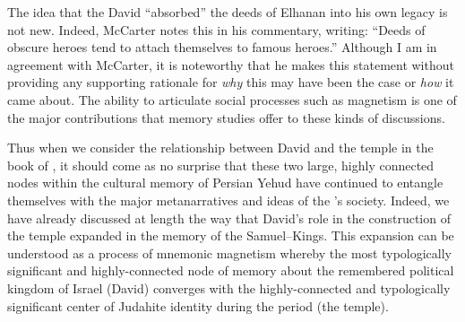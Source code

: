 The idea that the David ``absorbed'' the deeds of Elhanan into his own legacy is not new. Indeed, McCarter notes this in his commentary, writing: ``Deeds of obscure heroes tend to attach themselves to famous heroes.''\autocite[450]{mccarter1984} Although I am in agreement with McCarter, it is noteworthy that he makes this statement without providing any supporting rationale for \emph{why} this may have been the case or \emph{how} it came about. The ability to articulate social processes such as magnetism is one of the major contributions that memory studies offer to these kinds of discussions.

Thus when we consider the relationship between David and the temple in the book of \chronicles, it should come as no surprise that these two large, highly connected nodes within the cultural memory of Persian Yehud have continued to entangle themselves with the major metanarratives and ideas of the \chronicler's society. Indeed, we have already discussed at length the way that David's role in the construction of the temple expanded in the memory of the \chronicler \visavis Samuel--Kings. This expansion can be understood as a process of mnemonic magnetism whereby the most typologically significant and highly-connected node of memory about the remembered political kingdom of Israel (David) converges with the highly-connected and typologically significant center of Judahite identity during the \secondtemple period (the temple). 
